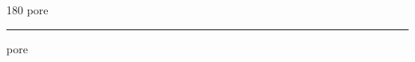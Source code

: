 
\begin{frame}
\begin{center}
\begin{turn}{180}
{\fontsize{2.5cm}{1em}\selectfont pore}
\end{turn}
\vspace{1em}\par  
\hrule
\vspace{1em}\par  
{\fontsize{2.5cm}{1em}\selectfont pore}
\end{center}
\end{frame}
